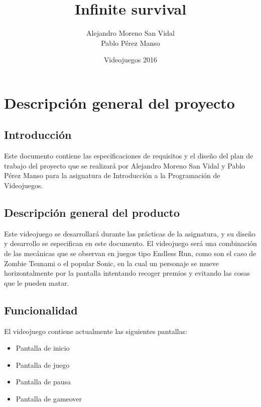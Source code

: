 \documentclass[palatino]{apuntes}
\title{Infinite survival}
\author{Alejandro Moreno San Vidal \\ Pablo Pérez Manso}
\date{Videojuegos 2016}
\begin{document}
\pagestyle{plain}
\maketitle
\tableofcontents
\newpage

\chapter{Descripción general del proyecto}

\section{Introducción}
Este documento contiene las especificaciones de requisitos y el diseño del plan de trabajo del proyecto que se realizará por Alejandro Moreno San Vidal y Pablo Pérez Manso para la asignatura de Introducción a la Programación de Videojuegos.

\section{Descripción general del producto}
Este videojuego se desarrollará durante las prácticas de la asignatura, y su diseño y desarrollo se especifican en este documento. El videojuego será una combinación de las mecánicas que se observan en juegos tipo Endless Run, como son el caso de Zombie Tsunami o el popular Sonic, en la cual un personaje se mueve horizontalmente por la pantalla intentando recoger premios y evitando las cosas que le pueden matar.

\section{Funcionalidad}

El videojuego contiene actualmente las siguientes pantallas:
\begin{itemize}
    \item Pantalla de inicio
    \item Pantalla de juego
    \item Pantalla de pausa
    \item Pantalla de gameover
  
\end{itemize}
\end{document}
